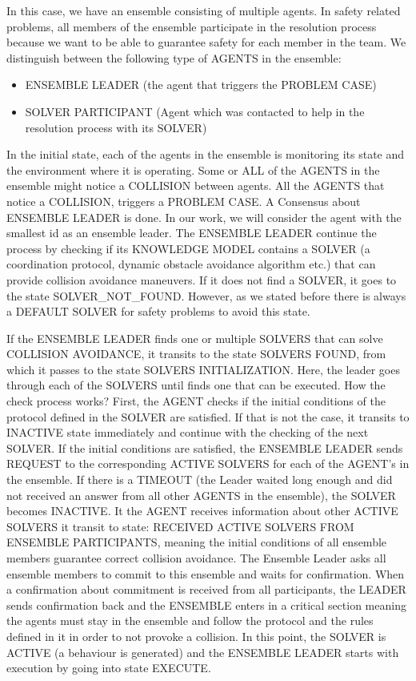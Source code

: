 \documentclass[journal]{IEEEtran}
\theoremstyle{definition}
\begin{document}
In this case, we have an ensemble consisting of multiple agents. In safety related problems, all members of the ensemble participate in the resolution process because we want to be able to guarantee safety for each member in the team. We distinguish between the following type of AGENTS in the ensemble:
\begin{itemize}
    \item ENSEMBLE LEADER (the agent that triggers the PROBLEM CASE)
    \item SOLVER PARTICIPANT (Agent which was contacted to help in the resolution process with its SOLVER)
\end{itemize}

In the initial state, each of the agents in the ensemble is monitoring its state and the environment where it is operating. Some or ALL of the AGENTS in the ensemble might notice a COLLISION between agents. All the AGENTS that notice a COLLISION, triggers a PROBLEM CASE. A Consensus about ENSEMBLE LEADER is done. In our work, we will consider the agent with the  smallest id as an ensemble leader. The ENSEMBLE LEADER continue the process by checking if its KNOWLEDGE MODEL contains a SOLVER (a coordination protocol, dynamic obstacle avoidance algorithm etc.) that can provide collision avoidance maneuvers.
If it does not find a SOLVER, it goes to the state SOLVER\_NOT\_FOUND. However, as we stated before there is always a DEFAULT SOLVER for safety problems to avoid this state.

If the ENSEMBLE LEADER finds one or multiple SOLVERS that can solve COLLISION AVOIDANCE, it transits to the state SOLVERS FOUND, from which it passes to the state SOLVERS INITIALIZATION. Here, the leader goes through each of the SOLVERS until finds one that can be executed.
How the check process works?
First, the AGENT checks if the initial conditions of the protocol defined in the SOLVER are satisfied. If that is not the case, it transits to INACTIVE state immediately and continue with the checking of the next SOLVER. If the initial conditions are satisfied, the ENSEMBLE LEADER sends REQUEST to the corresponding ACTIVE SOLVERS for each of the AGENT’s in the ensemble.
If there is a TIMEOUT (the Leader waited long enough and did not received an answer from all other AGENTS in the ensemble), the SOLVER becomes INACTIVE. It the AGENT receives information about other ACTIVE SOLVERS it transit to state: RECEIVED ACTIVE SOLVERS FROM ENSEMBLE PARTICIPANTS,  meaning the initial conditions of all ensemble members guarantee correct collision avoidance. The Ensemble Leader asks all ensemble members to commit to this ensemble and waits for confirmation. When a confirmation about commitment is received from all participants, the LEADER sends confirmation back and the ENSEMBLE enters in a critical section meaning the agents must stay in the ensemble and follow the protocol and the rules defined in it in order to not provoke a collision. In this point, the SOLVER is ACTIVE (a behaviour is generated) and the ENSEMBLE LEADER starts with execution by going into state EXECUTE.
\end{document}
